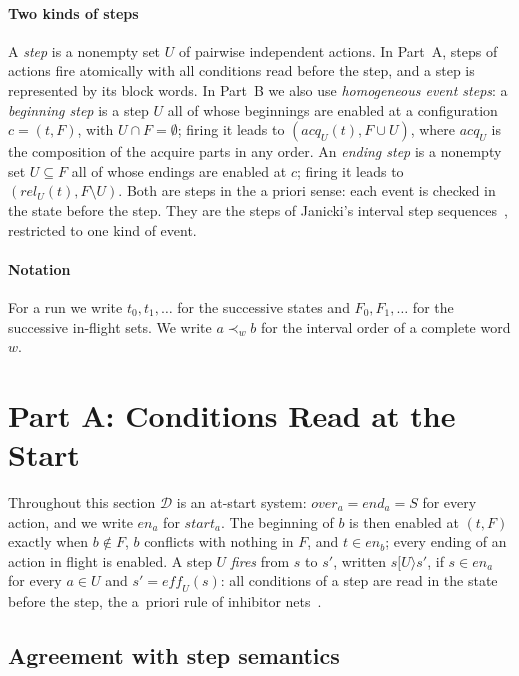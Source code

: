 \documentclass[preprint,12pt]{elsarticle}
\theoremstyle{plain}
\theoremstyle{definition}
\newcommand{\en}{\mathit{en}}
\newcommand{\st}{\mathit{start}}
\newcommand{\ovr}{\mathit{over}}
\newcommand{\stp}{\mathit{end}}
\newcommand{\eff}{\mathit{eff}}
\newcommand{\acq}{\mathit{acq}}
\newcommand{\rel}{\mathit{rel}}
\newcommand{\steparrow}[1]{\mathrel{[#1\rangle}}
\newcommand{\D}{\mathcal{D}}
\begin{document}
\paragraph{Two kinds of steps}
A \emph{step} is a nonempty set $U$ of pairwise independent actions. In Part~A, steps of actions fire atomically with all conditions read before the step, and a step is represented by its block words. In Part~B we also use \emph{homogeneous event steps}: a \emph{beginning step} is a step $U$ all of whose beginnings are enabled at a configuration $c = (t, F)$, with $U \cap F = \emptyset$; firing it leads to $(\acq_U(t), F \cup U)$, where $\acq_U$ is the composition of the acquire parts in any order. An \emph{ending step} is a nonempty set $U \subseteq F$ all of whose endings are enabled at $c$; firing it leads to $(\rel_U(t), F \setminus U)$. Both are steps in the a priori sense: each event is checked in the state before the step. They are the steps of Janicki's interval step sequences~\cite{Janicki2019}, restricted to one kind of event.

\paragraph{Notation}
For a run we write $t_0, t_1, \dots$ for the successive states and $F_0, F_1, \dots$ for the successive in-flight sets. We write $a \prec_w b$ for the interval order of a complete word $w$.

\section{Part A: Conditions Read at the Start}
\label{sec:partA}

Throughout this section $\D$ is an at-start system: $\ovr_a = \stp_a = S$ for every action, and we write $\en_a$ for $\st_a$. The beginning of $b$ is then enabled at $(t, F)$ exactly when $b \notin F$, $b$ conflicts with nothing in $F$, and $t \in \en_b$; every ending of an action in flight is enabled. A step $U$ \emph{fires} from $s$ to $s'$, written $s \steparrow{U} s'$, if $s \in \en_a$ for every $a \in U$ and $s' = \eff_U(s)$: all conditions of a step are read in the state before the step, the a~priori rule of inhibitor nets~\cite{JanickiKoutny1995}.

\subsection{Agreement with step semantics}
\end{document}
